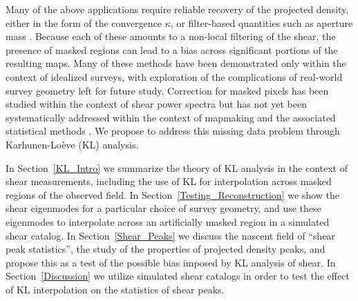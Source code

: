 Many of the above applications require reliable recovery of 
the projected density, 
either in the form of the convergence $\kappa$, or filter-based quantities 
such as aperture mass \citep{Schneider98}.  
Because each of these amounts to a non-local filtering of the shear, 
the presence of masked regions can lead to a bias across significant
portions of the resulting maps.  Many of these methods have been demonstrated 
only within the context of idealized surveys, with exploration of the 
complications of real-world survey geometry left for future study.  
Correction for masked pixels has been studied within the context 
of shear power spectra \citep{Schneider10,Hikage10}
but has not yet been systematically addressed
within the context of mapmaking and the associated statistical methods
\citep[see, however,][for some possible approaches]{Padmanabhan03,Pires09}.
We propose to address this missing data problem through 
Karhunen-Lo\`{e}ve (KL) analysis.

In Section~\ref{KL_Intro} we summarize the theory of KL analysis in the
context of shear measurements, including the use of KL for interpolation
across masked regions of the observed field.
In Section~\ref{Testing_Reconstruction} we show the shear eigenmodes for
a particular choice of survey geometry, and use these eigenmodes to
interpolate across an artificially masked region in a simulated shear catalog.
In Section~\ref{Shear_Peaks} we discuss the nascent field of 
``shear peak statistics'',
the study of the properties of projected density peaks, and propose this
as a test of the possible bias imposed by KL analysis of shear.
In Section~\ref{Discussion} we utilize simulated shear catalogs 
in order to test the effect of KL interpolation on
the statistics of shear peaks.

